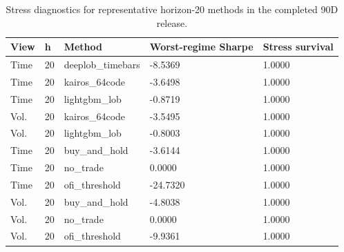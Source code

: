 \begin{table}[t]
\centering
\caption{Stress diagnostics for representative horizon-20 methods in the completed 90D release.}
\label{tab:table_17_stress_h20}
\begin{tabular}{lllll}
\toprule
View & h & Method & Worst-regime Sharpe & Stress survival \\
\midrule
Time & 20 & deeplob\_timebars & -8.5369 & 1.0000 \\
Time & 20 & kairos\_64code & -3.6498 & 1.0000 \\
Time & 20 & lightgbm\_lob & -0.8719 & 1.0000 \\
Vol. & 20 & kairos\_64code & -3.5495 & 1.0000 \\
Vol. & 20 & lightgbm\_lob & -0.8003 & 1.0000 \\
Time & 20 & buy\_and\_hold & -3.6144 & 1.0000 \\
Time & 20 & no\_trade & 0.0000 & 1.0000 \\
Time & 20 & ofi\_threshold & -24.7320 & 1.0000 \\
Vol. & 20 & buy\_and\_hold & -4.8038 & 1.0000 \\
Vol. & 20 & no\_trade & 0.0000 & 1.0000 \\
Vol. & 20 & ofi\_threshold & -9.9361 & 1.0000 \\
\bottomrule
\end{tabular}
\end{table}
